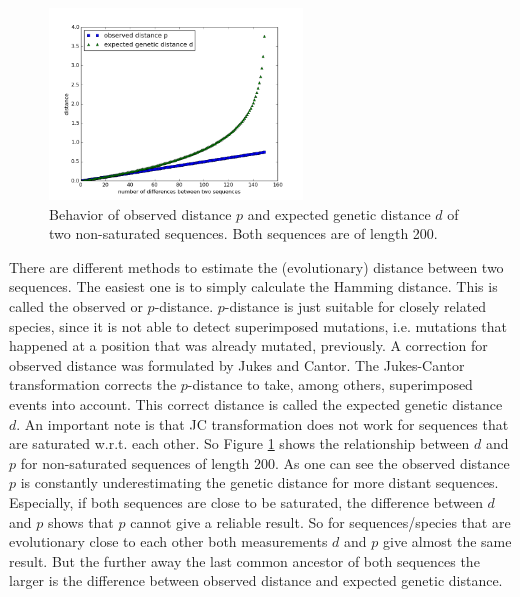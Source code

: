 \documentclass[%
   10pt,              %
   ngerman,           %
   a4paper,           %
   DIV11,             %
]{scrartcl}%
\begin{document}
\subsection{}

\begin{figure}[t]
 \centering
 \includegraphics[width=0.6\textwidth]{exec3bFigure.png}
 \caption{Behavior of observed distance $p$ and expected genetic distance $d$ of two non-saturated sequences. Both sequences are of length 200.}
 \label{fig:pdRelationship}
\end{figure}

There are different methods to estimate the (evolutionary) distance between two sequences. The easiest 
one is to simply calculate the Hamming distance. This is called the observed or $p$-distance. $p$-distance 
is just suitable for closely related species, since it is not able to detect superimposed mutations, i.e. 
mutations that happened at a position that was already mutated, previously. A correction for observed 
distance was formulated by Jukes and Cantor. The Jukes-Cantor transformation corrects the $p$-distance 
to take, among others, superimposed events into account. This correct distance is called the expected 
genetic distance $d$. An important note is that JC transformation does 
not work for sequences that are saturated w.r.t. each other. So Figure \ref{fig:pdRelationship} shows 
the relationship between $d$ and $p$ for non-saturated sequences of length 200. As one can see the 
observed distance $p$ is constantly underestimating the genetic distance for more distant sequences. 
Especially, if both sequences are close to be saturated, the difference between $d$ and $p$ shows 
that $p$ cannot give a reliable result. So for sequences/species that are evolutionary close to each 
other both measurements $d$ and $p$ give almost the same result. But the further away the last common 
ancestor of both sequences the larger is the difference between observed distance and expected genetic 
distance. 

%	
\end{document}
